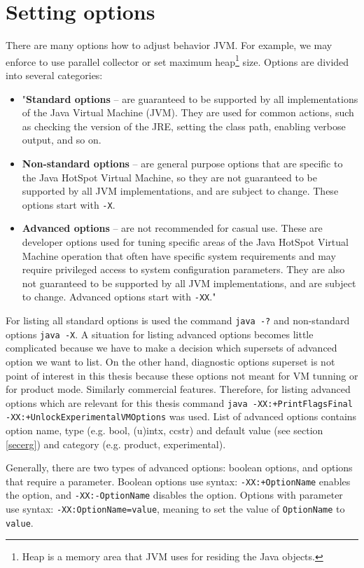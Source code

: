 \documentclass[
  digital, %
  oneside,
  notable, %
  nolof,     %
  nolot     %
]{fithesis3}
\begin{document}
\section{Setting options}\label{secoptions}
There are many options how to adjust behavior JVM. For example, we may enforce to use parallel collector or set maximum heap\footnote{Heap is a memory area that JVM uses for residing the Java objects.} size. Options are divided into several categories:
\begin{itemize}
	\item "\textbf{Standard options} -- are guaranteed to be supported by all implementations of the Java Virtual Machine (JVM). They are used for common actions, such as checking the version of the JRE, setting the class path, enabling verbose output, and so on.
	\item \textbf{Non-standard options} -- are general purpose options that are specific to the Java HotSpot Virtual Machine, so they are not guaranteed to be supported by all JVM implementations, and are subject to change. These options start with \texttt{-X}.
	\item \textbf{Advanced options} -- are not recommended for casual use. These are developer options used for tuning specific areas of the Java HotSpot Virtual Machine operation that often have specific system requirements and may require privileged access to system configuration parameters. They are also not guaranteed to be supported by all JVM implementations, and are subject to change. Advanced options start with \texttt{-XX}." \cite{java}
\end{itemize}
For listing all standard options is used the command \texttt{java -?} and non-standard options \texttt{java -X}. A situation for listing advanced options becomes little complicated because we have to make a decision which supersets of advanced option we want to list. On the other hand, diagnostic options superset is not point of interest in this thesis because these options not meant for VM tunning or for product mode. Similarly commercial features. Therefore, for listing advanced options which are relevant for this thesis command \texttt{java -XX:+PrintFlagsFinal -XX:+UnlockExperimentalVMOptions} was used. List of advanced options contains option name, type (e.g. bool, (u)intx, ccstr) and default value (see section \ref{secerg}) and category (e.g. product, experimental).

Generally, there are two types of advanced options: boolean options, and options that require a parameter. Boolean options use syntax: \texttt{-XX:+OptionName} enables the option, and \texttt{-XX:-OptionName} disables the option. Options with parameter use syntax: \texttt{-XX:OptionName=value}, meaning to set the value of \texttt{OptionName} to \texttt{value}. \cite{scott}
\end{document}
